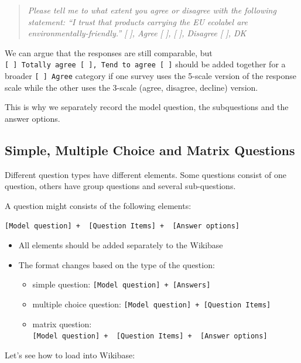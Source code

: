 \documentclass[
  letterpaper,
  DIV=11,
  numbers=noendperiod]{scrreprt}
\providecommand{\tightlist}{%
  \setlength{\itemsep}{0pt}\setlength{\parskip}{0pt}}\usepackage{longtable,booktabs,array}
\begin{document}
\begin{quote}
\emph{Please tell me to what extent you agree or disagree with the
following statement: ``I trust that products carrying the EU ecolabel
are environmentally-friendly.'' {[} {]}, Agree {[} {]}, {[} {]},
Disagree {[} {]}, DK}
\end{quote}

We can argue that the responses are still comparable, but
\texttt{{[}\ {]}\ Totally\ agree\ {[}\ {]},\ Tend\ to\ agree\ {[}\ {]}}
should be added together for a broader \texttt{{[}\ {]}\ Agree} category
if one survey uses the 5-scale version of the response scale while the
other uses the 3-scale (agree, disagree, decline) version.

This is why we separately record the model question, the subquestions
and the answer options.

\subsection{Simple, Multiple Choice and Matrix
Questions}\label{simple-multiple-choice-and-matrix-questions}

Different question types have different elements. Some questions consist
of one question, others have group questions and several sub-questions.

A question might consists of the following elements:

\texttt{{[}Model\ question{]}\ +\ \ {[}Question\ Items{]}\ +\ \ {[}Answer\ options{]}}

\begin{itemize}
\item
  All elements should be added separately to the Wikibase
\item
  The format changes based on the type of the question:

  \begin{itemize}
  \tightlist
  \item
    simple question: \texttt{{[}Model\ question{]}\ +\ {[}Answers{]}}
  \item
    multiple choice question:
    \texttt{{[}Model\ question{]}\ +\ {[}Question\ Items{]}}
  \item
    matrix question:
    \texttt{{[}Model\ question{]}\ +\ \ {[}Question\ Items{]}\ +\ \ {[}Answer\ options{]}}
  \end{itemize}
\end{itemize}

Let's see how to load into Wikibase:
\end{document}
